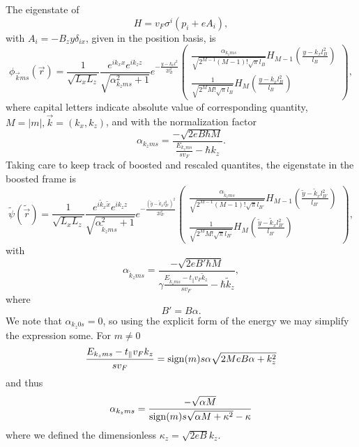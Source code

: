 The eigenstate of
\[
H = v_{F} \sigma ^{i} ( p_{i} + e A_{i} ),
\]
with \(A_{i} = - B_{z} y \delta _{i x}\), given in the position basis, is
\begin{equation}
  \phi _{\vec{k} m s}(\vec{r}) = \frac{1}{\sqrt{L_xL_z}}
  \frac{e^{ik_x x}e^{ik_z z}}{\sqrt{\alpha _{k_z m s}^2 + 1}}
  e^{-\frac{y-k_x l^2}{2 l_B^2}}
  \begin{pmatrix}
    \frac{\alpha _{k_z m s}}{\sqrt{2^{M-1} (M-1)! \sqrt{\pi } l_B}} H_{M-1}\left( \frac{y-k_x l_B^2}{l_B} \right)\\
    \frac{1}{\sqrt{2^M M! \sqrt{\pi } l_B}} H_M \left( \frac{y-k_x l_B^2}{l_B} \right)
  \end{pmatrix},
\end{equation}
where capital letters indicate absolute value of corresponding quantity, $M=|m|, \vec{k} = (k_x, k_z)$, and with the normalization factor
\begin{equation}
  \alpha _{k_z m s} = \frac{-\sqrt{2eB\hbar M}}{\frac{E_{k_z m s}}{s v_{F}} - \hbar  k_z}.
\end{equation}
Taking care to keep track of boosted and rescaled quantites, the eigenstate in the boosted frame is
\begin{equation}
  \label{eq:54}
  \tilde{\psi}(\tilde{\vec{r}}) =
  \frac{1}{\sqrt{L_xL_z}}
  \frac{e^{i \tilde{k}_x \tilde{x}}e^{i k_z z}}{\sqrt{\alpha _{\tilde{k}_z m s}^2 + 1}}
  e^{-\frac{\left(\tilde{y} - \tilde{k}_x l_{B'}^2\right)^2}{2 l_{B'}^2}}
  \begin{pmatrix}
    \frac{\alpha _{\tilde{k}_z m s}}{\sqrt{2^{M-1} (M-1)! \sqrt{\pi } l_{B'}}} H_{M-1}\left( \frac{\tilde{y} - \tilde{k}_x l_{B'}^2}{l_{B'}} \right)\\
    \frac{1}{\sqrt{2^M M! \sqrt{\pi } l_{B'}}} H_M \left( \frac{\tilde{y} - \tilde{k}_x l_{B'}^2}{l_{B'}} \right)
  \end{pmatrix},
\end{equation}
with
\begin{equation}
  \alpha _{\tilde{k}_z m s} = \frac{-\sqrt{2e B' \hbar M}}{ \gamma \frac{E_{\tilde{k}_z m s} - t_{\parallel} v_{F} \tilde{k}_{z}}{s v_{F}} - \hbar  \tilde{k}_z},
\end{equation}
where
\[
B' = B \alpha.
\]
We note that \( \alpha_{k_z 0 s} = 0 \), so using the explicit form of the energy we may simplify the expression some.
For \( m\neq 0 \)
\[
  \frac{
    E_{k_z m s} - t_{\parallel} v_F k_z
  }{s v_{F}} = \operatorname{sign}(m) s \alpha \sqrt{2 M e B \alpha + k_{z}^2}
\]
and thus
\begin{equation}
  \label{eq:55}
  \alpha_{k_z m s} =
  \frac{-\sqrt{ \alpha M }}{\operatorname{sign}(m) s \sqrt{\alpha M + \kappa^2} - \kappa}
\end{equation}
where we defined the dimensionless \( \kappa_z = \sqrt{2 e B} k_z  \).


